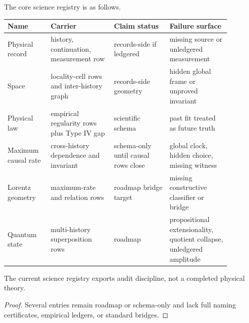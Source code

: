 \begin{definition}
\label{def:philosophy-core-science-registry}
The core science registry is as follows.

\begin{center}
\begin{tabular}{p{0.17\linewidth}p{0.25\linewidth}p{0.22\linewidth}p{0.24\linewidth}}
\textbf{Name} & \textbf{Carrier} & \textbf{Claim status} & \textbf{Failure surface} \\
\hline
Physical record & history, continuation, measurement row & records-side if ledgered & missing source or unledgered measurement \\
Space & locality-cell rows and inter-history graph & records-side geometry & hidden global frame or unproved invariant \\
Physical law & empirical regularity rows plus Type IV gap & scientific schema & past fit treated as future truth \\
Maximum causal rate & cross-history dependence and invariant & schema-only until causal rows close & global clock, hidden choice, missing witness \\
Lorentz geometry & maximum-rate and relation rows & roadmap bridge target & missing constructive classifier or bridge \\
Quantum state & multi-history superposition rows & roadmap & propositional extensionality, quotient collapse, unledgered amplitude \\
\end{tabular}
\end{center}
\end{definition}

\begin{corollary}
\label{cor:philosophy-science-registry-exports-discipline}
The current science registry exports audit discipline, not a completed
physical theory.
\end{corollary}
\begin{proof}
Several entries remain roadmap or schema-only and lack full naming
certificates, empirical ledgers, or standard bridges.
\end{proof}

